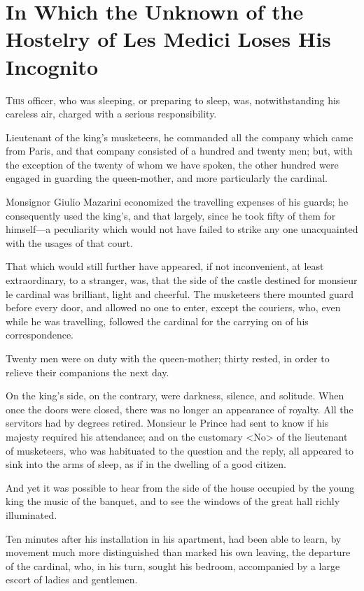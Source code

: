 \chapter[The Unknown of the Hostelry of Les Medici]{In Which the Unknown of the Hostelry of Les Medici Loses His Incognito}

\lettrine{T}{his} officer, who was sleeping, or preparing to sleep, was, notwithstanding his careless air, charged with a serious responsibility.

\zz
Lieutenant of the king's musketeers, he commanded all the company which came from Paris, and that company consisted of a hundred and twenty men; but, with the exception of the twenty of whom we have spoken, the other hundred were engaged in guarding the queen-mother, and more particularly the cardinal.

Monsignor Giulio Mazarini economized the travelling expenses of his guards; he consequently used the king's, and that largely, since he took fifty of them for himself—a peculiarity which would not have failed to strike any one unacquainted with the usages of that court.

That which would still further have appeared, if not inconvenient, at least extraordinary, to a stranger, was, that the side of the castle destined for monsieur le cardinal was brilliant, light and cheerful. The musketeers there mounted guard before every door, and allowed no one to enter, except the couriers, who, even while he was travelling, followed the cardinal for the carrying on of his correspondence.

Twenty men were on duty with the queen-mother; thirty rested, in order to relieve their companions the next day.

On the king's side, on the contrary, were darkness, silence, and solitude. When once the doors were closed, there was no longer an appearance of royalty. All the servitors had by degrees retired. Monsieur le Prince had sent to know if his majesty required his attendance; and on the customary <No> of the lieutenant of musketeers, who was habituated to the question and the reply, all appeared to sink into the arms of sleep, as if in the dwelling of a good citizen.

And yet it was possible to hear from the side of the house occupied by the young king the music of the banquet, and to see the windows of the great hall richly illuminated.

Ten minutes after his installation in his apartment,  had been able to learn, by movement much more distinguished than marked his own leaving, the departure of the cardinal, who, in his turn, sought his bedroom, accompanied by a large escort of ladies and gentlemen.

